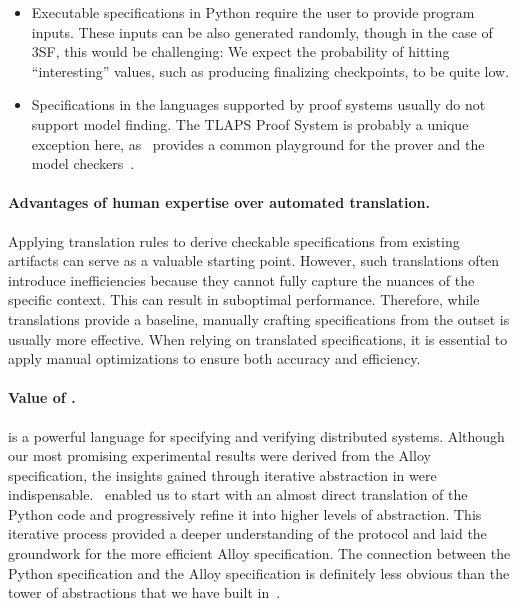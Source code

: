 \begin{itemize}
  \item Executable specifications in Python require the user to provide program
    inputs. These inputs can be also generated randomly, though in the case of
    3SF, this would be challenging: We expect the probability of hitting
    ``interesting'' values, such as producing finalizing checkpoints, to be
    quite low.
  \item Specifications in the languages supported by proof systems usually do
    not support model finding. The TLAPS Proof System is probably a unique
    exception here, as~\tlap{} provides a common playground for the prover and the
    model checkers~\cite{KonnovKM22}.
\end{itemize}

\paragraph{Advantages of human expertise over automated translation.} Applying
translation rules to derive checkable specifications from existing artifacts can
serve as a valuable starting point. However, such translations often introduce
inefficiencies because they cannot fully capture the nuances of the specific
context. This can result in suboptimal performance. Therefore, while
translations provide a baseline, manually crafting specifications from the
outset is usually more effective. When relying on translated specifications, it is
essential to apply manual optimizations to ensure both accuracy and efficiency.

\paragraph{Value of \tlap{}.} \tlap{} is a powerful language for specifying and
verifying distributed systems. Although our most promising experimental results
were derived from the Alloy specification, the insights gained through
iterative abstraction in \tlap{} were indispensable.\ \tlap{} enabled us to
start with an almost direct translation of the Python code and progressively
refine it into higher levels of abstraction. This iterative process provided a
deeper understanding of the protocol and laid the groundwork for the more
efficient Alloy specification. The connection between the Python specification
and the Alloy specification is definitely less obvious than the tower of
abstractions that we have built in~\tlap{}.
